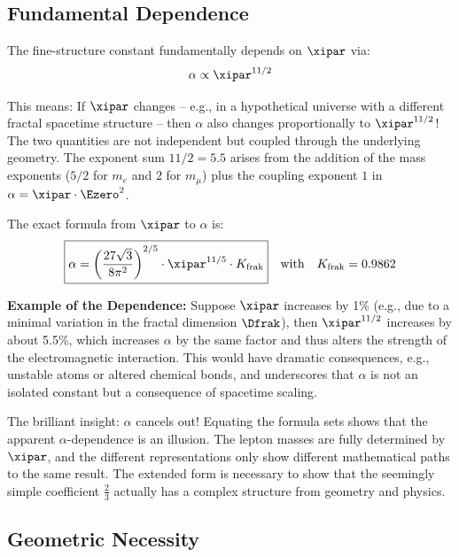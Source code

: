 	\subsection{Fundamental Dependence}
	
	The fine-structure constant fundamentally depends on $\xipar$ via:
	\begin{equation}
		\alpha \propto \xipar^{11/2}
		\label{eq:alpha_xi_dependence}
	\end{equation}
	
	This means: If $\xipar$ changes – e.g., in a hypothetical universe with a different fractal spacetime structure – then $\alpha$ also changes proportionally to $\xipar^{11/2}$! The two quantities are not independent but coupled through the underlying geometry. The exponent sum $11/2 = 5.5$ arises from the addition of the mass exponents ($5/2$ for $m_e$ and $2$ for $m_\mu$) plus the coupling exponent $1$ in $\alpha = \xipar \cdot \Ezero^2$.
	
	The exact formula from $\xipar$ to $\alpha$ is:
	\begin{equation}
		\boxed{\alpha = \left(\frac{27\sqrt{3}}{8\pi^2}\right)^{2/5} \cdot \xipar^{11/5} \cdot K_{\text{frak}}}
		\quad \text{with} \quad K_{\text{frak}} = 0.9862
	\end{equation}
	
	\textbf{Example of the Dependence:} Suppose $\xipar$ increases by 1\% (e.g., due to a minimal variation in the fractal dimension $\Dfrak$), then $\xipar^{11/2}$ increases by about 5.5\%, which increases $\alpha$ by the same factor and thus alters the strength of the electromagnetic interaction. This would have dramatic consequences, e.g., unstable atoms or altered chemical bonds, and underscores that $\alpha$ is not an isolated constant but a consequence of spacetime scaling.
	
	The brilliant insight: $\alpha$ cancels out! Equating the formula sets shows that the apparent $\alpha$-dependence is an illusion. The lepton masses are fully determined by $\xipar$, and the different representations only show different mathematical paths to the same result. The extended form is necessary to show that the seemingly simple coefficient $\frac{2}{3}$ actually has a complex structure from geometry and physics.
	
	\subsection{Geometric Necessity}
	
